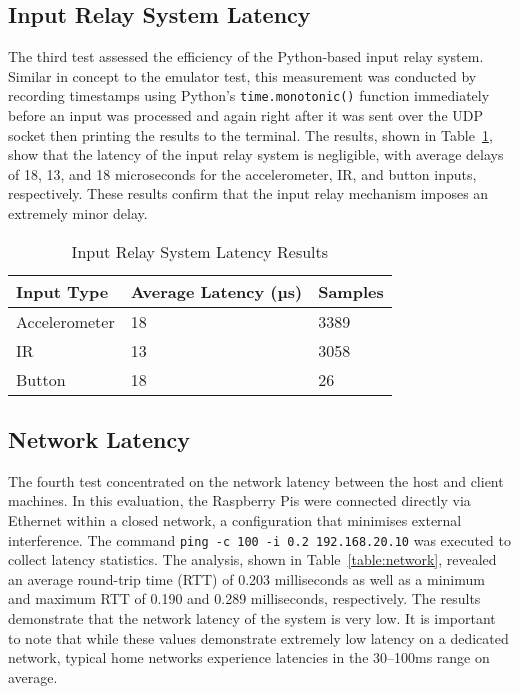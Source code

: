 \subsection{Input Relay System Latency}

The third test assessed the efficiency of the Python-based input relay
system. Similar in concept to the emulator test, this measurement was conducted
by recording timestamps using Python’s \texttt{time.monotonic()} function immediately
before an input was processed and again right after it was sent over the UDP
socket then printing the results to the terminal. The results, shown in
Table~\ref{table:inputrelay}, show that the latency of the input relay system is
negligible, with average delays of 18, 13, and 18 microseconds for the
accelerometer, IR, and button inputs, respectively. These results confirm that the input
relay mechanism imposes an extremely minor delay.

\begin{table}[!ht]
    \centering
    \begin{tabular}{|l|l|l|}
    \hline
        Input Type & Average Latency (µs) & Samples \\ \hline
        Accelerometer & 18 & 3389 \\ \hline
        IR & 13 & 3058 \\ \hline
        Button & 18 & 26 \\ \hline
    \end{tabular}
    \caption{Input Relay System Latency Results}
    \label{table:inputrelay}

  \end{table}

\subsection{Network Latency}

The fourth test concentrated on the network latency between the host and client
machines. In this evaluation, the Raspberry Pis were connected directly via
Ethernet within a closed network, a configuration that minimises external
interference. The command \texttt{ping -c 100 -i 0.2 192.168.20.10} was executed to
collect latency statistics. The analysis, shown in Table~\ref{table:network},
revealed an average round-trip time (RTT) of 0.203 milliseconds as well as a
minimum and maximum RTT of 0.190 and 0.289 milliseconds, respectively. The results
demonstrate that the network latency of the system is very low. It is important to note that while these values demonstrate extremely low latency on a
dedicated network, typical home networks experience latencies in
the 30–100ms range on average\cite{latencySurvey}.

